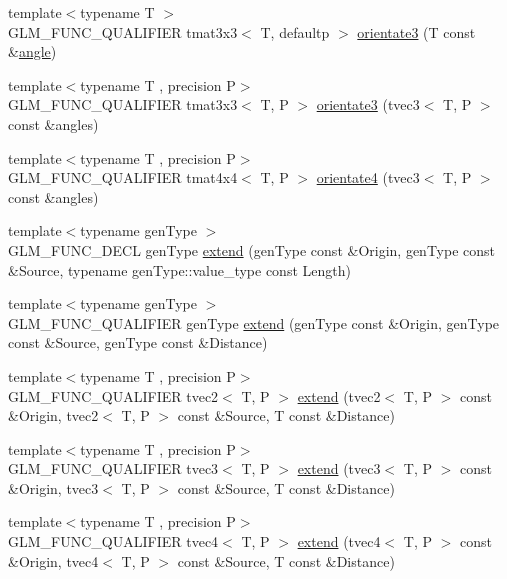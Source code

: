 \begin{DoxyCompactItemize}
{\footnotesize template$<$typename T $>$ }\\G\+L\+M\+\_\+\+F\+U\+N\+C\+\_\+\+Q\+U\+A\+L\+I\+F\+I\+E\+R tmat3x3$<$ T, defaultp $>$ \hyperlink{group__gtx__euler__angles_gab188e2526dea3c003e86e298f618085e}{orientate3} (T const \&\hyperlink{group__gtc__quaternion_gad4a4448baedb198b2b1e7880d2544dc9}{angle})
\item 
{\footnotesize template$<$typename T , precision P$>$ }\\G\+L\+M\+\_\+\+F\+U\+N\+C\+\_\+\+Q\+U\+A\+L\+I\+F\+I\+E\+R tmat3x3$<$ T, P $>$ \hyperlink{group__gtx__euler__angles_ga33f0d790cecd8337ee83f8e3a8109b11}{orientate3} (tvec3$<$ T, P $>$ const \&angles)
\item 
{\footnotesize template$<$typename T , precision P$>$ }\\G\+L\+M\+\_\+\+F\+U\+N\+C\+\_\+\+Q\+U\+A\+L\+I\+F\+I\+E\+R tmat4x4$<$ T, P $>$ \hyperlink{group__gtx__euler__angles_ga4e25c9468b6f002c76e9a2412bcfa503}{orientate4} (tvec3$<$ T, P $>$ const \&angles)
\item 
{\footnotesize template$<$typename gen\+Type $>$ }\\G\+L\+M\+\_\+\+F\+U\+N\+C\+\_\+\+D\+E\+C\+L gen\+Type \hyperlink{group__gtx__extend_ga8140caae613b0f847ab0d7175dc03a37}{extend} (gen\+Type const \&Origin, gen\+Type const \&Source, typename gen\+Type\+::value\+\_\+type const Length)
\item 
{\footnotesize template$<$typename gen\+Type $>$ }\\G\+L\+M\+\_\+\+F\+U\+N\+C\+\_\+\+Q\+U\+A\+L\+I\+F\+I\+E\+R gen\+Type \hyperlink{namespaceglm_a88c4890406fab3280de470ce780e6b9d}{extend} (gen\+Type const \&Origin, gen\+Type const \&Source, gen\+Type const \&Distance)
\item 
{\footnotesize template$<$typename T , precision P$>$ }\\G\+L\+M\+\_\+\+F\+U\+N\+C\+\_\+\+Q\+U\+A\+L\+I\+F\+I\+E\+R tvec2$<$ T, P $>$ \hyperlink{namespaceglm_a432a531afe9ca9e820a0fb31d5d0f5eb}{extend} (tvec2$<$ T, P $>$ const \&Origin, tvec2$<$ T, P $>$ const \&Source, T const \&Distance)
\item 
{\footnotesize template$<$typename T , precision P$>$ }\\G\+L\+M\+\_\+\+F\+U\+N\+C\+\_\+\+Q\+U\+A\+L\+I\+F\+I\+E\+R tvec3$<$ T, P $>$ \hyperlink{namespaceglm_a5771da74ce8281d316accbbd4d704e95}{extend} (tvec3$<$ T, P $>$ const \&Origin, tvec3$<$ T, P $>$ const \&Source, T const \&Distance)
\item 
{\footnotesize template$<$typename T , precision P$>$ }\\G\+L\+M\+\_\+\+F\+U\+N\+C\+\_\+\+Q\+U\+A\+L\+I\+F\+I\+E\+R tvec4$<$ T, P $>$ \hyperlink{namespaceglm_a867ffccf950071fefa345b66fb1578f0}{extend} (tvec4$<$ T, P $>$ const \&Origin, tvec4$<$ T, P $>$ const \&Source, T const \&Distance)

\end{DoxyCompactItemize}

